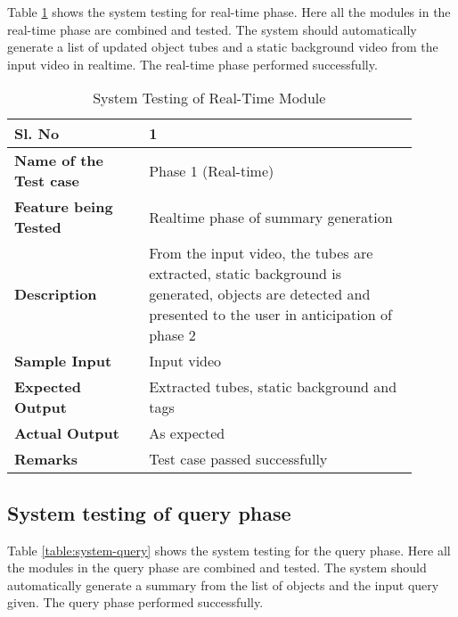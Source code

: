     Table \ref{table:system-realtime} shows the system testing for real-time phase. Here all the modules in the real-time phase are combined and tested. The system should automatically generate a list of updated object tubes and a static background video from the input video in realtime. The real-time phase performed successfully.

    \FloatBarrier
    \begin{table}[H]
        \begin{tabular}{|p{0.3\linewidth}|p{0.6\linewidth}|}
            \hline
            \textbf{Sl. No }              &\textbf{ 1}\\
            \hline
            \textbf{Name of the Test case}  & Phase 1 (Real-time) \\
            \hline
            \textbf{Feature being Tested}  & Realtime phase of summary generation \\
            \hline
            \textbf{Description}           & From the input video, the tubes are extracted, static background is generated, objects are detected and presented to the user in anticipation of phase 2 \\
            \hline
            \textbf{Sample Input}          & Input video \\
            \hline
            \textbf{Expected Output}       & Extracted tubes, static background and tags \\
            \hline
            \textbf{Actual Output}         & As expected \\
            \hline
            \textbf{Remarks }              & Test case passed successfully \\
            \hline
        \end{tabular}
        \caption{System Testing of Real-Time Module}
        \label{table:system-realtime}
    \end{table}


    \subsection{System testing of query phase}

    Table \ref{table:system-query} shows the system testing for the query phase. Here all the modules in the query phase are combined and tested. The system should automatically generate a summary from the list of objects and the input query given. The query phase performed successfully.

